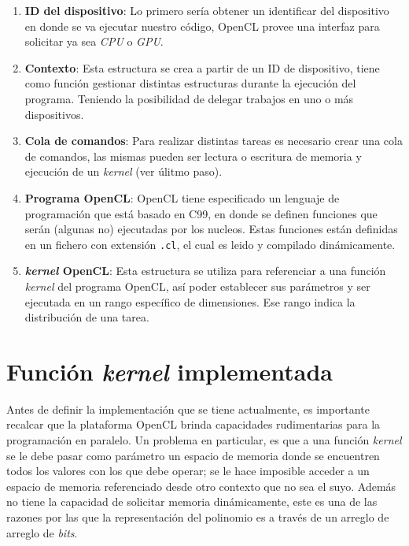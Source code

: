 \begin{enumerate}
    \item \textbf{ID del dispositivo}: Lo primero sería obtener un identificar del dispositivo en donde se va ejecutar nuestro código, OpenCL provee una interfaz para solicitar ya sea \textit{CPU} o \textit{GPU}.

    \item \textbf{Contexto}: Esta estructura se crea a partir de un ID de dispositivo, tiene como función gestionar distintas estructuras durante la ejecución del programa. Teniendo la posibilidad de delegar trabajos en uno o más dispositivos.

    \item \textbf{Cola de comandos}: Para realizar distintas tareas es necesario crear una cola de comandos, las mismas pueden ser lectura o escritura de memoria y ejecución de un \textit{kernel} (ver úlitmo paso).

    \item \textbf{Programa OpenCL}: OpenCL tiene especificado un lenguaje de programación que está basado en C99, en donde se definen funciones que serán (algunas no) ejecutadas por los nucleos. Estas funciones están definidas en un fichero con extensión \texttt{.cl}, el cual es leido y compilado dinámicamente.

    \item \textbf{\textit{kernel} OpenCL}: Esta estructura se utiliza para referenciar a una función \textit{kernel} del programa OpenCL, así poder establecer sus parámetros y ser ejecutada en un rango específico de dimensiones. Ese rango indica la distribución de una tarea.
\end{enumerate}

\section{Función \textit{kernel} implementada}

Antes de definir la implementación que se tiene actualmente, es importante recalcar que la plataforma OpenCL brinda capacidades rudimentarias para la programación en paralelo. Un problema en particular, es que a una función \textit{kernel} se le debe pasar como parámetro un espacio de memoria donde se encuentren todos los valores con los que debe operar; se le hace imposible acceder a un espacio de memoria referenciado desde otro contexto que no sea el suyo. Además no tiene la capacidad de solicitar memoria dinámicamente, este es una de las razones por las que la representación del polinomio es a través de un arreglo de arreglo de \textit{bits}.

